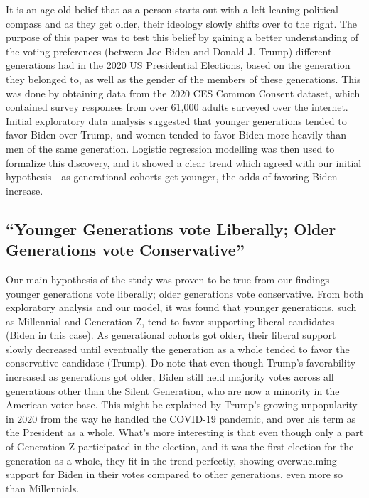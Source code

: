 \documentclass[
  letterpaper,
  DIV=11,
  numbers=noendperiod]{scrartcl}
\begin{document}
It is an age old belief that as a person starts out with a left leaning
political compass and as they get older, their ideology slowly shifts
over to the right. The purpose of this paper was to test this belief by
gaining a better understanding of the voting preferences (between Joe
Biden and Donald J. Trump) different generations had in the 2020 US
Presidential Elections, based on the generation they belonged to, as
well as the gender of the members of these generations. This was done by
obtaining data from the 2020 CES Common Consent dataset, which contained
survey responses from over 61,000 adults surveyed over the internet.
Initial exploratory data analysis suggested that younger generations
tended to favor Biden over Trump, and women tended to favor Biden more
heavily than men of the same generation. Logistic regression modelling
was then used to formalize this discovery, and it showed a clear trend
which agreed with our initial hypothesis - as generational cohorts get
younger, the odds of favoring Biden increase.

\hypertarget{younger-generations-vote-liberally-older-generations-vote-conservative}{%
\subsection{``Younger Generations vote Liberally; Older Generations vote
Conservative''}\label{younger-generations-vote-liberally-older-generations-vote-conservative}}

Our main hypothesis of the study was proven to be true from our findings
- younger generations vote liberally; older generations vote
conservative. From both exploratory analysis and our model, it was found
that younger generations, such as Millennial and Generation Z, tend to
favor supporting liberal candidates (Biden in this case). As
generational cohorts got older, their liberal support slowly decreased
until eventually the generation as a whole tended to favor the
conservative candidate (Trump). Do note that even though Trump's
favorability increased as generations got older, Biden still held
majority votes across all generations other than the Silent Generation,
who are now a minority in the American voter base. This might be
explained by Trump's growing unpopularity in 2020 from the way he
handled the COVID-19 pandemic, and over his term as the President as a
whole. What's more interesting is that even though only a part of
Generation Z participated in the election, and it was the first election
for the generation as a whole, they fit in the trend perfectly, showing
overwhelming support for Biden in their votes compared to other
generations, even more so than Millennials.
\end{document}
